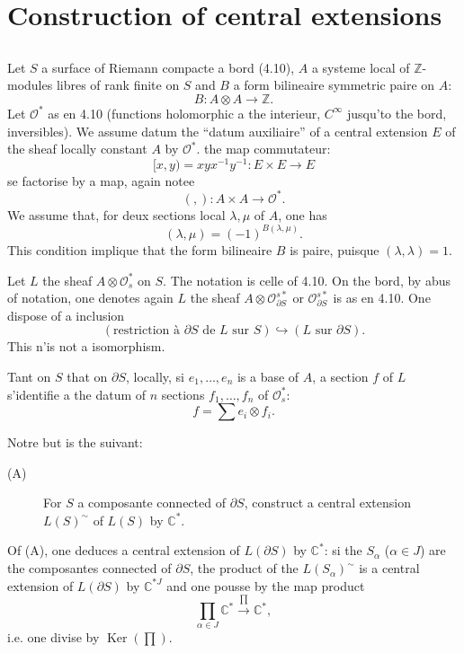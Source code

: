\documentclass[12pt,a4paper]{article}
\theoremstyle{plain}
\theoremstyle{definition}
\theoremstyle{remark}
\DeclareMathOperator{\Ker}{Ker}
\newcommand{\cO}{\mathcal{O}}
\newcommand{\Z}{\mathbb{Z}}
\newcommand{\C}{\mathbb{C}}
\providecommand{\cO}{\mathcal{O}}
\providecommand{\Ker}{\operatorname{Ker}}
\begin{document}
\section{Construction of central extensions}

\subsection{}

Let $S$ a surface of Riemann compacte a bord (4.10), $A$ a systeme local
of $\Z$-modules libres of rank finite on $S$ and $B$ a form bilineaire symmetric paire on $A$:
\[
B : A \otimes A \to \Z.
\]
Let $\cO^*$ as en 4.10 (functions holomorphic a the interieur, $C^\infty$ jusqu'to the bord,
inversibles). We assume datum the ``datum auxiliaire'' of a central extension $E$
of the sheaf locally constant $A$ by $\cO^*$. the map commutateur:
\[
[x, y) = xyx^{-1}y^{-1} : E \times E \to E
\]
se factorise by a map, again notee
\[
(,) : A \times A \to \cO^*.
\]
We assume that, for deux sections local $\lambda, \mu$ of $A$, one has
\begin{equation}\label{eq:5.1.1}
(\lambda, \mu) = (-1)^{B(\lambda, \mu)}.
\end{equation}
This condition implique that the form bilineaire $B$ is paire, puisque $(\lambda, \lambda) = 1$.

Let $L$ the sheaf $A \otimes \cO_s^*$ on $S$. The notation is celle of 4.10. On the bord, by abus
of notation, one denotes again $L$ the sheaf $A \otimes \cO_{\partial S}^{s*}$ or $\cO_{\partial S}^{s*}$ is as en 4.10. One dispose
of a inclusion
\[
(\text{restriction à } \partial S \text{ de } L \text{ sur } S) \hookrightarrow (L \text{ sur } \partial S).
\]
This n'is not a isomorphism.

Tant on $S$ that on $\partial S$, locally, si $e_1, \ldots, e_n$ is a base of $A$, a section $f$
of $L$ s'identifie a the datum of $n$ sections $f_1, \ldots, f_n$ of $\cO_s^*$:
\[
f = \sum e_i \otimes f_i.
\]

Notre but is the suivant:

\begin{description}
\item[(A)] For $S$ a composante connected of $\partial S$, construct a central extension $L(S)^\sim$
of $L(S)$ by $\C^*$.
\end{description}

Of (A), one deduces a central extension of $L(\partial S)$ by $\C^*$: si the $S_\alpha$ ($\alpha \in J$) are the
composantes connected of $\partial S$, the product of the $L(S_\alpha)^\sim$ is a central extension of $L(\partial S)$
by $\C^{*J}$ and one pousse by the map product
\[
\prod_{\alpha \in J} \C^* \xrightarrow{\prod} \C^*,
\]
i.e. one divise by $\Ker(\prod)$.
\end{document}
